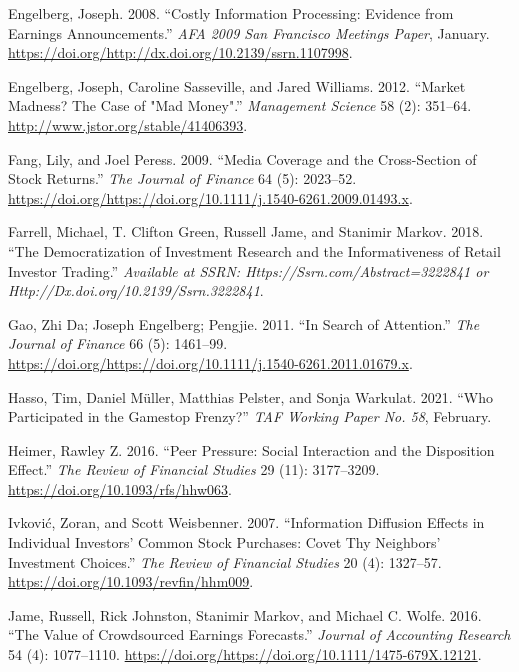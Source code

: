 \documentclass[12pt,]{article}
\begin{document}
\leavevmode\hypertarget{ref-engelberg2008}{}%
Engelberg, Joseph. 2008. ``Costly Information Processing: Evidence from
Earnings Announcements.'' \emph{AFA 2009 San Francisco Meetings Paper},
January.
\href{https://doi.org/http://dx.doi.org/10.2139/ssrn.1107998\%20}{https://doi.org/http://dx.doi.org/10.2139/ssrn.1107998}.

\leavevmode\hypertarget{ref-engelberg2012}{}%
Engelberg, Joseph, Caroline Sasseville, and Jared Williams. 2012.
``Market Madness? The Case of "Mad Money".'' \emph{Management Science}
58 (2): 351--64. \url{http://www.jstor.org/stable/41406393}.

\leavevmode\hypertarget{ref-fang2009}{}%
Fang, Lily, and Joel Peress. 2009. ``Media Coverage and the
Cross-Section of Stock Returns.'' \emph{The Journal of Finance} 64 (5):
2023--52.
\url{https://doi.org/https://doi.org/10.1111/j.1540-6261.2009.01493.x}.

\leavevmode\hypertarget{ref-farrell2018}{}%
Farrell, Michael, T. Clifton Green, Russell Jame, and Stanimir Markov.
2018. ``The Democratization of Investment Research and the
Informativeness of Retail Investor Trading.'' \emph{Available at SSRN:
Https://Ssrn.com/Abstract=3222841 or
Http://Dx.doi.org/10.2139/Ssrn.3222841}.

\leavevmode\hypertarget{ref-da2011}{}%
Gao, Zhi Da; Joseph Engelberg; Pengjie. 2011. ``In Search of
Attention.'' \emph{The Journal of Finance} 66 (5): 1461--99.
\url{https://doi.org/https://doi.org/10.1111/j.1540-6261.2011.01679.x}.

\leavevmode\hypertarget{ref-hasso2021}{}%
Hasso, Tim, Daniel Müller, Matthias Pelster, and Sonja Warkulat. 2021.
``Who Participated in the Gamestop Frenzy?'' \emph{TAF Working Paper No.
58}, February.

\leavevmode\hypertarget{ref-heimer2016}{}%
Heimer, Rawley Z. 2016. ``Peer Pressure: Social Interaction and the
Disposition Effect.'' \emph{The Review of Financial Studies} 29 (11):
3177--3209. \url{https://doi.org/10.1093/rfs/hhw063}.

\leavevmode\hypertarget{ref-ivkovic2007}{}%
Ivković, Zoran, and Scott Weisbenner. 2007. ``Information Diffusion
Effects in Individual Investors' Common Stock Purchases: Covet Thy
Neighbors' Investment Choices.'' \emph{The Review of Financial Studies}
20 (4): 1327--57. \url{https://doi.org/10.1093/revfin/hhm009}.

\leavevmode\hypertarget{ref-jame2016}{}%
Jame, Russell, Rick Johnston, Stanimir Markov, and Michael C. Wolfe.
2016. ``The Value of Crowdsourced Earnings Forecasts.'' \emph{Journal of
Accounting Research} 54 (4): 1077--1110.
\url{https://doi.org/https://doi.org/10.1111/1475-679X.12121}.
\end{document}
